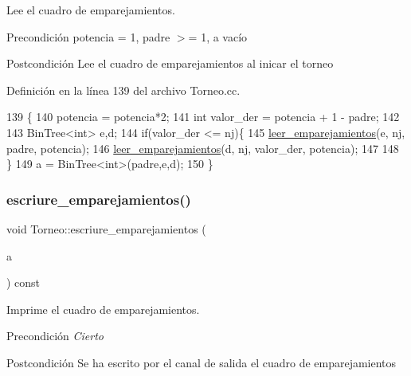 Lee el cuadro de emparejamientos. 

\begin{DoxyPrecond}{Precondición}
potencia = 1, padre $>$= 1, a vacío 
\end{DoxyPrecond}
\begin{DoxyPostcond}{Postcondición}
Lee el cuadro de emparejamientos al inicar el torneo 
\end{DoxyPostcond}


Definición en la línea 139 del archivo Torneo.\+cc.


\begin{DoxyCode}
139                                                                                  \{
140     potencia = potencia*2;
141     \textcolor{keywordtype}{int} valor\_der = potencia + 1 - padre;
142 
143     BinTree<int> e,d;
144     \textcolor{keywordflow}{if}(valor\_der <= nj)\{
145         \hyperlink{class_torneo_ae4d0e16d82621a4f5e16fcec74ccdcba}{leer\_emparejamientos}(e, nj, padre, potencia);
146         \hyperlink{class_torneo_ae4d0e16d82621a4f5e16fcec74ccdcba}{leer\_emparejamientos}(d, nj, valor\_der, potencia);
147                 
148     \}
149     a = BinTree<int>(padre,e,d);
150 \}
\end{DoxyCode}
\mbox{\label{class_torneo_ada7981ac531bf186fa6df689620574cc}} 
\subsubsection{\texorpdfstring{escriure\+\_\+emparejamientos()}{escriure\_emparejamientos()}}
{\footnotesize\ttfamily void Torneo\+::escriure\+\_\+emparejamientos (\begin{DoxyParamCaption}\item[{const Bin\+Tree$<$ int $>$ \&}]{a }\end{DoxyParamCaption}) const\hspace{0.3cm}{\ttfamily [private]}}



Imprime el cuadro de emparejamientos. 

\begin{DoxyPrecond}{Precondición}
{\itshape Cierto} 
\end{DoxyPrecond}
\begin{DoxyPostcond}{Postcondición}
Se ha escrito por el canal de salida el cuadro de emparejamientos 
\end{DoxyPostcond}


